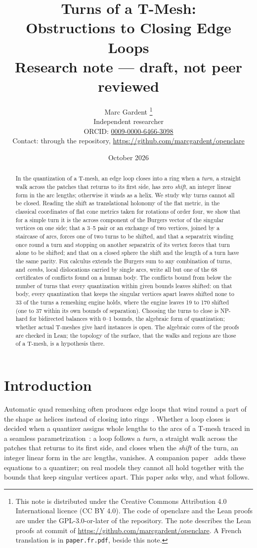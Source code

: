 \documentclass[11pt,a4paper]{article}
\title{Turns of a T-Mesh:\\
Obstructions to Closing Edge Loops\\[0.5em]
\large Research note --- draft, not peer reviewed}
\author{Marc Gardent%
\thanks{This note is distributed under the Creative Commons Attribution
4.0 International licence (CC BY 4.0). The code of openclare and the Lean
proofs are under the GPL-3.0-or-later of the repository. The note describes
the Lean proofs at commit \texttt{\enginecommit} of
\url{https://github.com/marcgardent/openclare}.
A French translation is in \texttt{paper.fr.pdf}, beside this note.}\\
\normalsize Independent researcher\\
\normalsize ORCID: \href{https://orcid.org/0009-0000-6466-3098}{0009-0000-6466-3098}\\
\normalsize Contact: through the repository,
\url{https://github.com/marcgardent/openclare}}
\date{October 2026}
\begin{document}
\maketitle

\begin{abstract}
In the quantization of a T-mesh, an edge loop closes into a ring when a
\emph{turn}, a straight walk across the patches that returns to its first
side, has zero \emph{shift}, an integer linear form in the arc lengths;
otherwise it winds as a helix. We study why turns cannot all be closed.
Reading the shift as translational holonomy of the flat metric, in the
classical coordinates of flat cone metrics taken for rotations of order four,
we show that for a simple turn it is the across component of the Burgers vector of the
singular vertices on one side; that a 3--5 pair or an exchange of two
vertices, joined by a staircase of arcs, forces one of two turns to be
shifted, and that a separatrix winding once round a turn and stopping on
another separatrix of its vertex forces that turn alone to be shifted; and
that on a
closed sphere the shift and the length of a turn have the same parity. Fox calculus extends the Burgers sum to
any combination of turns, and \emph{combs}, local dislocations carried by
single arcs, write all but one of the $68$ certificates of conflicts found on a
human body.
The
conflicts bound from below the number of turns that every quantization within
given bounds leaves shifted: on that body, every quantization that keeps the
singular vertices apart leaves shifted none to 33 of the turns a remeshing
engine holds, where the engine leaves 19 to 170 shifted (one to 37 within its
own bounds of separation). Choosing the turns to close is NP-hard for bidirected
balances with $0$--$1$ bounds, the algebraic form of quantization; whether
actual T-meshes give hard instances is open. The algebraic cores
of the proofs are checked in Lean; the topology of the surface, that the walks
and regions are those of a T-mesh, is a hypothesis there.
\end{abstract}

\section{Introduction}

Automatic quad remeshing often produces edge loops that wind round a part of
the shape as helices instead of closing into
rings~\cite{bommes2011structure}. Whether a loop closes is decided when a
quantizer assigns whole lengths to the arcs of a T-mesh traced in a seamless
parametrization~\cite{campen2015qgp,lyon2021constrained,heistermann2023bimdf}:
a loop follows a \emph{turn}, a straight walk across the patches that returns
to its first side, and closes when the \emph{shift} of the turn, an integer
linear form in the arc lengths, vanishes. A companion
paper~\cite{gardent2026loops} adds these equations to a quantizer; on real
models they cannot all hold together with the bounds that keep singular
vertices apart. This paper asks why, and what follows.
\end{document}
